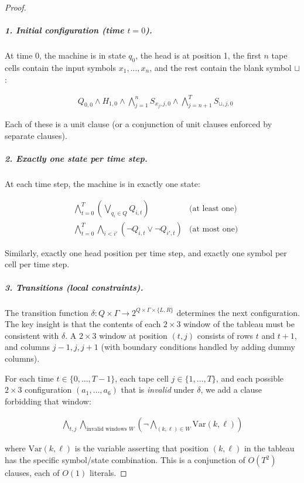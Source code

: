 \begin{proof}
\subparagraph{1. Initial configuration (time $t=0$).}
At time 0, the machine is in state $q_0$, the head is at position 1, the first $n$ tape cells contain the input symbols $x_1, \dots, x_n$, and the rest contain the blank symbol $\sqcup$:

\begin{align*}
& Q_{0,0} \land H_{1,0} \land \bigwedge_{j=1}^{n} S_{x_j, j, 0} \land \bigwedge_{j=n+1}^{T} S_{\sqcup, j, 0}
\end{align*}

Each of these is a unit clause (or a conjunction of unit clauses enforced by separate clauses).

\subparagraph{2. Exactly one state per time step.}
At each time step, the machine is in exactly one state:

\begin{align*}
& \bigwedge_{t=0}^{T} \left( \bigvee_{q_i \in Q} Q_{i,t} \right) & \text{(at least one)} \\
& \bigwedge_{t=0}^{T} \bigwedge_{i < i'} \left( \neg Q_{i,t} \lor \neg Q_{i',t} \right) & \text{(at most one)}
\end{align*}

Similarly, exactly one head position per time step, and exactly one symbol per cell per time step.

\subparagraph{3. Transitions (local constraints).}
The transition function $\delta: Q \times \Gamma \to 2^{Q \times \Gamma \times \{L,R\}}$ determines the next configuration. The key insight is that the contents of each $2 \times 3$ window of the tableau must be consistent with $\delta$. A $2 \times 3$ window at position $(t,j)$ consists of rows $t$ and $t+1$, and columns $j-1, j, j+1$ (with boundary conditions handled by adding dummy columns).

For each time $t \in \{0,\dots,T-1\}$, each tape cell $j \in \{1,\dots,T\}$, and each possible $2 \times 3$ configuration $(a_1, \dots, a_6)$ that is \emph{invalid} under $\delta$, we add a clause forbidding that window:

\begin{align*}
\bigwedge_{t,j} \bigwedge_{\text{invalid windows } W} \left( \neg \bigwedge_{(k,\ell) \in W} \text{Var}(k,\ell) \right)
\end{align*}

where $\text{Var}(k,\ell)$ is the variable asserting that position $(k,\ell)$ in the tableau has the specific symbol/state combination. This is a conjunction of $O(T^2)$ clauses, each of $O(1)$ literals.


\end{proof}
